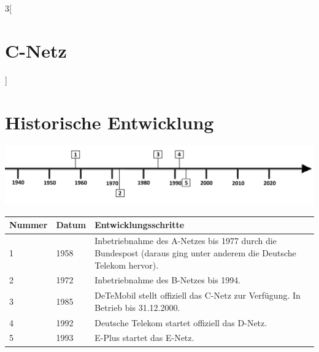 \begin{multicols}{3}[\section{C-Netz}]
\end{multicols}
\newpage
\section*{Historische Entwicklung}
\includegraphics[width=\textwidth]{Kapitel/C-Netz/Grafiken/Zeitstrahl}
\par
\noindent
\begin{tabular}{|p{1 cm}|p{1 cm}|p{15.55 cm}|}
	\hline
	Nummer & Datum & Entwicklungsschritte~\cite{c-netz.7}\\
	\hline
	1 & 1958 & Inbetriebnahme des A-Netzes bis 1977 durch die Bundespost (daraus ging unter anderem die Deutsche Telekom hervor).\\
	\hline
	2 & 1972 & Inbetriebnahme des B-Netzes bis 1994. \\
	\hline
	3 & 1985 & DeTeMobil stellt offiziell das C-Netz zur Verfügung. In Betrieb bis 31.12.2000.\\
	\hline
	4 & 1992 & Deutsche Telekom startet offiziell das D-Netz.\\
	\hline
	5 & 1993 & E-Plus startet das E-Netz.\\
	\hline
\end{tabular}
\par
